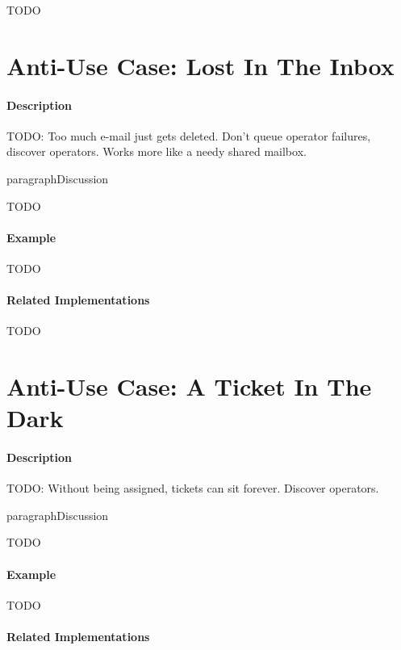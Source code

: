 {\Large TODO}

\section{Anti-Use Case: Lost In The Inbox}

\paragraph{Description}

{\Large TODO:} Too much e-mail just gets deleted.  Don't queue operator failures, discover operators.  Works more like a needy shared mailbox.

paragraph{Discussion}

{\Large TODO}

\paragraph{Example}

{\Large TODO}

\paragraph{Related Implementations}

{\Large TODO}

\section{Anti-Use Case: A Ticket In The Dark}

\paragraph{Description}

{\Large TODO:} Without being assigned, tickets can sit forever. Discover operators.

paragraph{Discussion}

{\Large TODO}

\paragraph{Example}

{\Large TODO}

\paragraph{Related Implementations}


